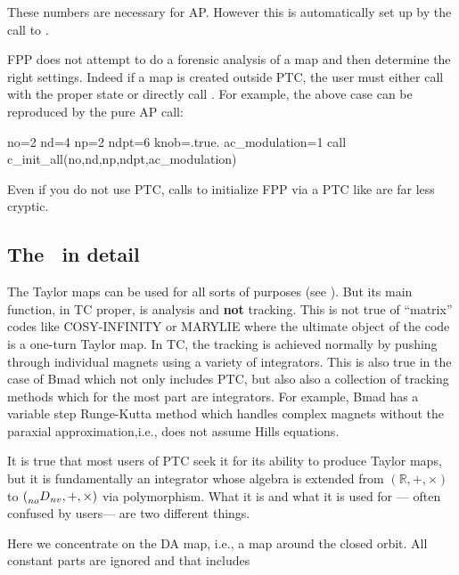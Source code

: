 \documentclass{hitec}     %
\begin{document}
{{{{{{{{{{{{ These numbers are necessary for AP. However this is automatically set up by the call to \newline  {}.
 
 FPP does not attempt to do a forensic analysis of a map and then determine the right settings. Indeed if a map is created outside PTC, the user must either call  with the proper state or directly call . For example, the above case can be reproduced by the pure AP call:
 
 
 \begin{code}
no=2
nd=4
np=2
ndpt=6
knob=.true.
ac_modulation=1
call c_init_all(no,nd,np,ndpt,ac_modulation) 
 \end{code}
 
 Even if you do not use PTC,  calls to initialize FPP via a PTC  like  are far less cryptic.
 
 
 \subsection{The  ~in detail}
\label{s:cdamapdet}
 
 The Taylor maps can be used for all sorts of purposes (see ). But its main function, in TC proper, is analysis and {\bf not} tracking. This is not true of ``matrix'' codes like COSY-INFINITY or MARYLIE where the ultimate object of the code is a one-turn Taylor map. In TC, the tracking is achieved normally by pushing through individual magnets using a variety of integrators. This is also true in the case of Bmad which not only includes PTC, but also also a collection of tracking methods which for the most part are integrators. For example, Bmad has a variable step Runge-Kutta method which handles complex magnets without the paraxial approximation,i.e., does not assume Hills equations.
 
 It is true that most users of PTC seek it for its ability to produce Taylor maps, but it is fundamentally an integrator whose algebra is extended from $(\mathbb{R},+,\times)$ to $(\prescript{}{no}{D}_{nv} ,+,\times )$ via polymorphism. What it is and what it is used for --- often confused by users--- are two different things.
 
 Here we concentrate on the DA map, i.e., a map around the closed orbit.  All constant parts are ignored and that includes \vn{c_damap%
 whose functions is described in section (\sref{s:concattpsa}) and \Eq{eq:concatt}: it is the $w_0$ of map $m_{w_0}$.
 
}}}}}}}}}}}}}
\end{document}
